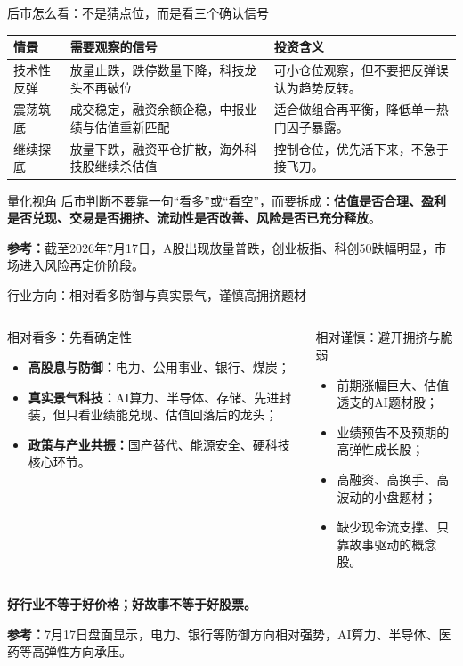 \documentclass[UTF8,aspectratio=169,11pt]{ctexbeamer}
\newcommand{\source}[1]{\vfill{\scriptsize\color{aqgray}\textbf{参考：}#1}}
\begin{document}
\begin{frame}{后市怎么看：不是猜点位，而是看三个确认信号}
\small
\begin{tabularx}{\textwidth}{p{2.9cm}X X}
\toprule
\textbf{情景} & \textbf{需要观察的信号} & \textbf{投资含义} \\
\midrule
技术性反弹 & 放量止跌，跌停数量下降，科技龙头不再破位 & 可小仓位观察，但不要把反弹误认为趋势反转。 \\
震荡筑底 & 成交稳定，融资余额企稳，中报业绩与估值重新匹配 & 适合做组合再平衡，降低单一热门因子暴露。 \\
继续探底 & 放量下跌，融资平仓扩散，海外科技股继续杀估值 & 控制仓位，优先活下来，不急于接飞刀。 \\
\bottomrule
\end{tabularx}

\vspace{0.3cm}
\begin{casebox}{量化视角}
后市判断不要靠一句“看多”或“看空”，而要拆成：\textbf{估值是否合理、盈利是否兑现、交易是否拥挤、流动性是否改善、风险是否已充分释放}。
\end{casebox}

\source{截至2026年7月17日，A股出现放量普跌，创业板指、科创50跌幅明显，市场进入风险再定价阶段。}
\end{frame}

\begin{frame}{行业方向：相对看多防御与真实景气，谨慎高拥挤题材}
\small
\begin{columns}[T,totalwidth=\textwidth]
\begin{greenbox}{相对看多：先看确定性}
\begin{itemize}
\item \textbf{高股息与防御：}电力、公用事业、银行、煤炭；
\item \textbf{真实景气科技：}AI算力、半导体、存储、先进封装，但只看业绩能兑现、估值回落后的龙头；
\item \textbf{政策与产业共振：}国产替代、能源安全、硬科技核心环节。
\end{itemize}
\end{greenbox}

\begin{riskbox}{相对谨慎：避开拥挤与脆弱}
\begin{itemize}
\item 前期涨幅巨大、估值透支的AI题材股；
\item 业绩预告不及预期的高弹性成长股；
\item 高融资、高换手、高波动的小盘题材；
\item 缺少现金流支撑、只靠故事驱动的概念股。
\end{itemize}
\end{riskbox}
\end{columns}

\vspace{0.2cm}
\begin{center}
\Large \textbf{好行业不等于好价格；好故事不等于好股票。}
\end{center}

\source{7月17日盘面显示，电力、银行等防御方向相对强势，AI算力、半导体、医药等高弹性方向承压。}
\end{frame}
\end{document}
